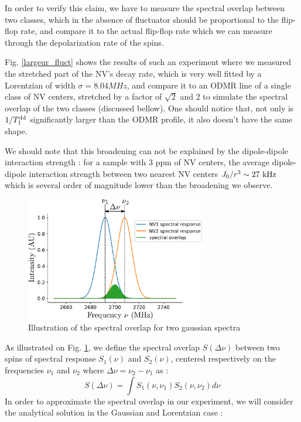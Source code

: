 \documentclass[preprintnumbers,amsmath,amssymb,onecolumn,12pt]{revtex4-2}
\begin{document}
In order to verify this claim, we have to measure the spectral overlap between two classes, which in the absence of fluctuator should be proportional to the flip-flop rate, and compare it to the actual flip-flop rate which we can measure through the depolarization rate of the spins.

Fig. \ref{largeur_fluct} shows the results of such an experiment where we measured the stretched part of the NV's decay rate, which is very well fitted by a Lorentzian of width $\sigma=8.04 MHz$, and compare it to an ODMR line of a single class of NV centers, stretched by a factor of $\sqrt{2}$ and 2 to simulate the spectral overlap of the two classes (discussed bellow). One should notice that, not only is $1/T_1^{\rm dd}$ significantly larger than the ODMR profile, it also doesn't have the same shape. 

We should note that this broadening can not be explained by the dipole-dipole interaction strength : for a sample with 3 ppm of NV centers, the average dipole-dipole interaction strength between two nearest NV centers $J_0/r^3 \sim 27\ \rm kHz$ which is several order of magnitude lower than the broadening we observe. 

\begin{figure}
\includegraphics[width=0.7\textwidth]{Figures_SI/overlap}
\caption{Illustration of the spectral overlap for two gaussian spectra}
\label{overlap}
\end{figure}

As illustrated on Fig. \ref{overlap}, we define the spectral overlap $S(\Delta \nu)$ between two spins of spectral response $S_1(\nu)$ and $S_2(\nu)$, centered respectively on the frequencies $\nu_1$ and $\nu_2$ where $\Delta \nu = \nu_2-\nu_1$ as :
\begin{equation}
S(\Delta \nu)=\int S_1(\nu, \nu_1)S_2(\nu, \nu_2) d\nu
\end{equation}
In order to approximate the spectral overlap in our experiment, we will consider the analytical solution in the Gaussian and Lorentzian case :
\end{document}
